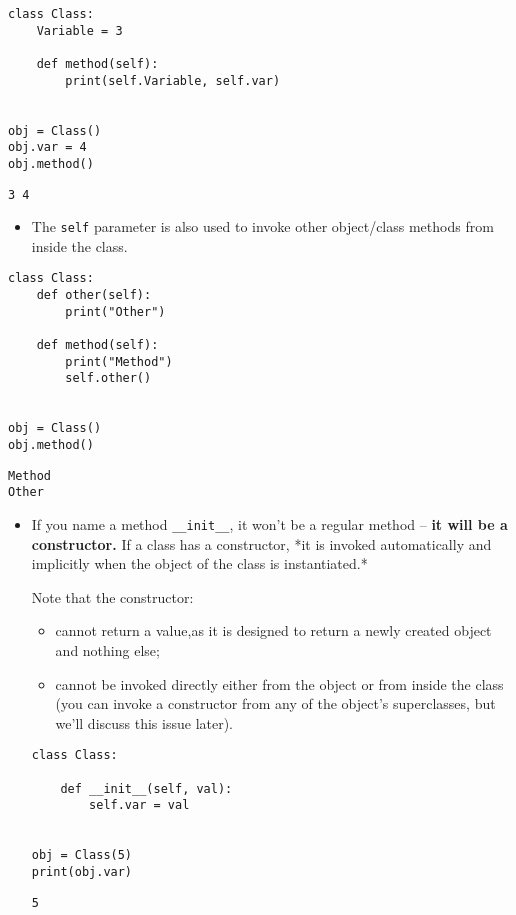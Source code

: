 \documentclass[11pt]{article}
\begin{document}
\begin{verbatim}
class Class:
    Variable = 3

    def method(self):
        print(self.Variable, self.var)


obj = Class()
obj.var = 4
obj.method()
\end{verbatim}

\begin{verbatim}
3 4
\end{verbatim}

\vspace{10 mm}

\begin{itemize}
\item The \texttt{self} parameter is also used to invoke other object/class methods
from inside the class.
\end{itemize}

\begin{verbatim}
class Class:
    def other(self):
        print("Other")

    def method(self):
        print("Method")
        self.other() 


obj = Class()
obj.method()
\end{verbatim}

\begin{verbatim}
Method
Other
\end{verbatim}

\vspace{10 mm}

\begin{itemize}
\item If you name a method \texttt{\_\_init\_\_}, it won’t be a regular method – \textbf{it
will be a constructor.} If a class has a constructor, *it is invoked
automatically and implicitly when the object of the class is
instantiated.*

Note that the constructor:

\begin{itemize}
\item cannot return a value,as it is designed to return a newly created
object and nothing else;

\item cannot be invoked directly either from the object or from inside the
class (you can invoke a constructor from any of the object’s
superclasses, but we’ll discuss this issue later).
\end{itemize}

\begin{verbatim}
class Class:

    def __init__(self, val):
        self.var = val


obj = Class(5)
print(obj.var)
\end{verbatim}

\begin{verbatim}
5
\end{verbatim}
\end{itemize}
\end{document}
